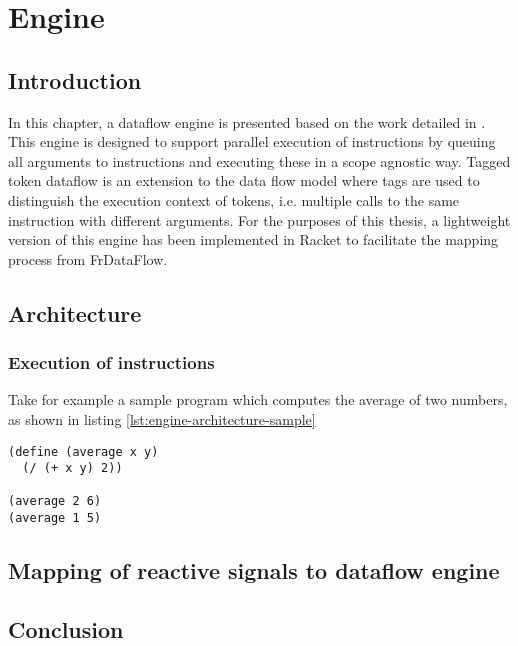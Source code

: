 \chapter{Engine}

\section{Introduction}

In this chapter, a dataflow engine is presented based on the work detailed in \citet{jennifer_extensible_2017}.
This engine is designed to support parallel execution of instructions by queuing all arguments to instructions and executing these in a scope agnostic way.
Tagged token dataflow is an extension to the data flow model where tags are used to distinguish the execution context of tokens, i.e. multiple calls to the same instruction with different arguments.
For the purposes of this thesis, a lightweight version of this engine has been implemented in Racket to facilitate the mapping process from FrDataFlow.

\section{Architecture}

\subsection{Execution of instructions}

Take for example a sample program which computes the average of two numbers, as shown in listing \ref{lst:engine-architecture-sample}

\begin{lstlisting}[caption={Computing the average of two numbers},captionpos=b,label={lst:engine-architecture-sample}]
(define (average x y)
  (/ (+ x y) 2))
  
(average 2 6)
(average 1 5)
\end{lstlisting}



\section{Mapping of reactive signals to dataflow engine}

\section{Conclusion}





